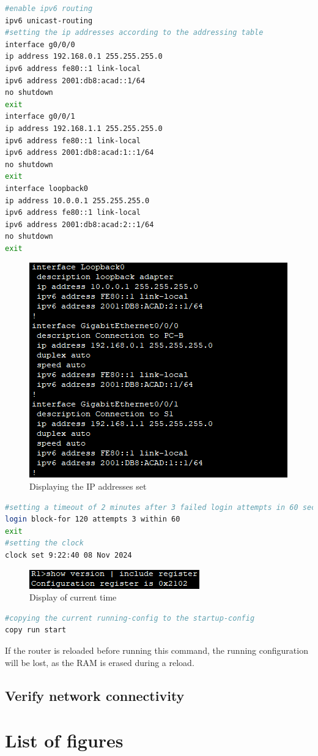 \documentclass[a4paper]{article}
\newcommand{\abc}{\hfill \break}
\begin{document}
\begin{lstlisting}[language=bash,
	keywordstyle=\color{black},
	rulecolor=\color{blue}]
#enable ipv6 routing
ipv6 unicast-routing
#setting the ip addresses according to the addressing table
interface g0/0/0
ip address 192.168.0.1 255.255.255.0
ipv6 address fe80::1 link-local
ipv6 address 2001:db8:acad::1/64
no shutdown
exit
interface g0/0/1
ip address 192.168.1.1 255.255.255.0
ipv6 address fe80::1 link-local
ipv6 address 2001:db8:acad:1::1/64
no shutdown
exit
interface loopback0
ip address 10.0.0.1 255.255.255.0
ipv6 address fe80::1 link-local
ipv6 address 2001:db8:acad:2::1/64
no shutdown
exit
\end{lstlisting}
\newpage
\begin{figure}[h]
	\includegraphics[scale=0.55]{images/showip.png}
	\centering
	\caption{Displaying the IP addresses set}
\end{figure}
\begin{lstlisting}[language=bash,
	keywordstyle=\color{black},
	rulecolor=\color{blue}]
#setting a timeout of 2 minutes after 3 failed login attempts in 60 seconds
login block-for 120 attempts 3 within 60
exit
#setting the clock
clock set 9:22:40 08 Nov 2024
\end{lstlisting}
\begin{figure}[h]
	\includegraphics[scale=0.55]{images/showclock.png}
	\centering
	\caption{Display of current time}
\end{figure}\abc

\begin{lstlisting}[language=bash,
	keywordstyle=\color{black},
	rulecolor=\color{blue}]
#copying the current running-config to the startup-config
copy run start
\end{lstlisting}
If the router is reloaded before running this command, the running configuration will be lost, as the RAM is erased during a reload.
\subsection{Verify network connectivity}

\newpage
\section{List of figures}

\listoffigures
\end{document}
